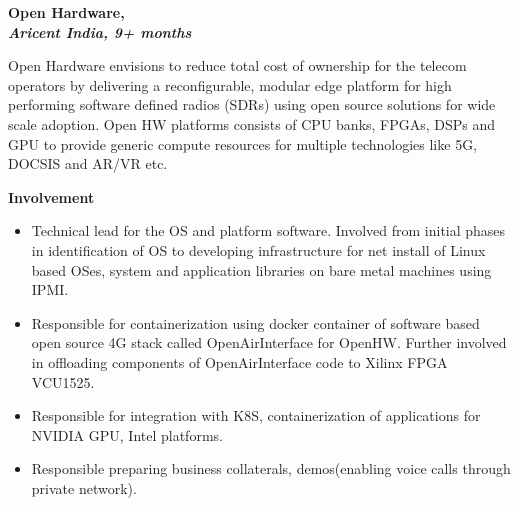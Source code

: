 \documentclass[a4paper,10pt]{memoir} %
\newcommand{\SmallSep}{\vspace{0.5em}} %
\newcommand{\CVItem}[2]{ %
\textbf{\color{RoyalBlue} #1}\par
#2
\SmallSep %
}
\begin{document}
\CVItem{Open Hardware, \\
	\textit{Aricent India, 9+ months}} {
	Open Hardware envisions to reduce total cost of ownership for the telecom operators by delivering a reconfigurable, modular edge platform for high performing software defined radios (SDRs) using open source solutions for wide scale adoption. Open HW platforms consists of CPU banks, FPGAs, DSPs and GPU to provide generic compute resources for multiple technologies like 5G, DOCSIS and AR/VR etc. 
	
	\textbf{Involvement}
	\renewcommand{\labelitemi}{$\bullet$}
	\begin{itemize}
		\item Technical lead for the OS and platform software. Involved from initial phases in identification of OS to developing infrastructure for net install of Linux based OSes, system and application libraries on bare metal machines using IPMI. 
		\item Responsible for containerization using docker container of software based open source 4G stack called OpenAirInterface for OpenHW. Further involved in offloading components of OpenAirInterface code to Xilinx FPGA VCU1525. 
		\item Responsible for integration with K8S, containerization of applications for NVIDIA GPU, Intel platforms.
		\item Responsible preparing business collaterals, demos(enabling voice calls through private network).
	\end{itemize}
	\hrulefill
}
\end{document}
